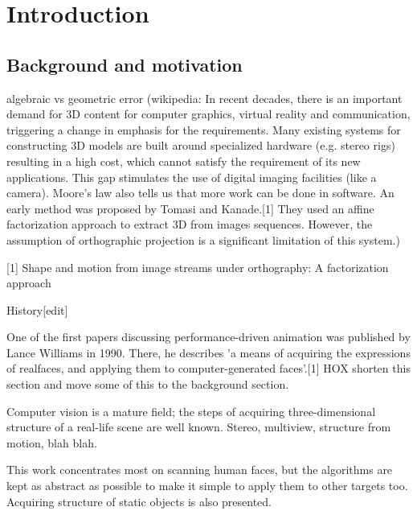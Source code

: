 \section{Introduction}

\thispagestyle{empty}

\subsection{Background and motivation}

algebraic vs geometric error
(wikipedia: In recent decades, there is an important demand for 3D content for computer graphics, virtual reality and communication, triggering a change in emphasis for the requirements. Many existing systems for constructing 3D models are built around specialized hardware (e.g. stereo rigs) resulting in a high cost, which cannot satisfy the requirement of its new applications. This gap stimulates the use of digital imaging facilities (like a camera). Moore's law also tells us that more work can be done in software. An early method was proposed by Tomasi and Kanade.[1] They used an affine factorization approach to extract 3D from images sequences. However, the assumption of orthographic projection is a significant limitation of this system.)

[1] Shape and motion from image streams under orthography: A factorization approach

History[edit]

One of the first papers discussing performance-driven animation was published by Lance Williams in 1990. There, he describes 'a means of acquiring the expressions of realfaces, and applying them to computer-generated faces'.[1]
HOX shorten this section and move some of this to the background section.

Computer vision is a mature field; the steps of acquiring three-dimensional structure of a real-life scene are well known.
Stereo, multiview, structure from motion, blah blah.

This work concentrates most on scanning human faces, but the algorithms are kept as abstract as possible to make it simple to apply them to other targets too.
Acquiring structure of static objects is also presented.



